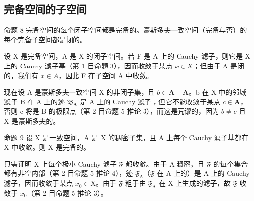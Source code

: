 \subsection{完备空间的子空间}

命题 8 完备空间的每个闭子空间都是完备的。豪斯多夫一致空间（完备与否）的每个完备子空间都是闭的。

设 X 是完备空间，A 是 X 的闭子空间。若 F 是 A 上的 Cauchy 滤子，则它是 X 上的 Cauchy 滤子基（第 1 目命题 3），因而收敛于某点 \(x \in X\)；但由于 A 是闭的，我们有 \(x \in A\)，因此 F 在子空间 A 中收敛。

现在设 A 是豪斯多夫一致空间 X 的非闭子集，且 \(b \in \overline{\mathbf{A}} - \mathbf{A}\)。b 在 X 中的邻域滤子 B 在 A 上的迹 \(\mathfrak{B}_{\mathbf{A}}\) 是 A 上的 Cauchy 滤子；但它不能收敛于某点 \(c \in \mathbf{A}\)，否则 c 将是 B 的极限点（第 2 目命题 5 推论 3），而这是荒谬的，因为 \(b \neq c\) 且 X 是豪斯多夫的。

命题 9 设 X 是一致空间，A 是 X 的稠密子集，且 A 上每个 Cauchy 滤子基都在 X 中收敛。则 X 是完备的。

只需证明 X 上每个极小 Cauchy 滤子 \(\mathfrak{F}\) 都收敛。由于 A 稠密，且 \(\mathfrak{F}\) 的每个集合都有非空内部（第 2 目命题 5 推论 4），迹 \(\mathfrak{F}_{\mathrm{A}}\)（\(\mathfrak{F}\) 在 A 上的）是 A 上的 Cauchy 滤子，因而收敛于某点 \(x_{0} \in \mathrm{X}\)。由于 \(\mathfrak{F}\) 粗于由 \(\mathfrak{F}_{\mathrm{A}}\) 在 X 上生成的滤子，故 \(\mathfrak{F}\) 收敛于 \(x_{0}\)（第 2 目命题 5 推论 3）。

